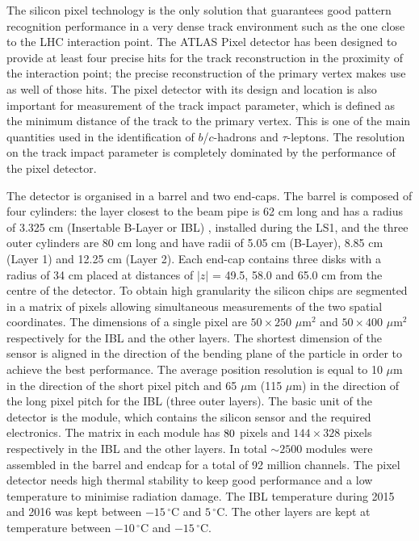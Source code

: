 The silicon pixel technology is the only solution that guarantees good pattern recognition performance in a very dense track environment such as the one close to the LHC interaction point. The ATLAS Pixel detector has been designed to provide at least four precise hits for the track reconstruction in the proximity of the interaction point;
 the precise reconstruction of the primary vertex makes use as well of those hits. The pixel detector with its design and location is also important for measurement of the track impact parameter, which is defined as the minimum distance of the track to the primary vertex. This is one of the main quantities used in the identification of $b$/$c$-hadrons and $\tau$-leptons. The resolution on the track impact parameter is completely dominated by the performance of the pixel detector.\par  The detector is organised in a barrel and two end-caps. The barrel is composed of four cylinders: the layer closest to the beam pipe is 62 cm long and has a radius of 3.325 cm (Insertable B-Layer or IBL) \cite{IBLTDR}, installed during the LS1, and the three outer cylinders are 80 cm long and have radii of 5.05 cm (B-Layer), 8.85 cm (Layer 1) and 12.25 cm (Layer 2). Each end-cap contains three disks with a radius of 34 cm placed at distances of $|z|$ = 49.5, 58.0 and 65.0 cm from the centre of the detector. To obtain high granularity the silicon chips are segmented in a matrix of pixels allowing simultaneous measurements of the two spatial coordinates. The dimensions of a single pixel are $50\times250$ $\mu $m$^{2}$ and $50\times400$ $\mu $m$^{2}$ respectively for the IBL and the other layers. The shortest dimension of the sensor is aligned in the direction of the bending plane of the particle in order to achieve the best performance. The average position resolution is equal to 10 $\mu$m in the direction of the short pixel pitch and 65 $\mu$m (115 $\mu$m) in the direction of the long pixel pitch for the IBL (three outer layers). The basic unit of the detector is the module, which contains the silicon sensor and the required electronics. The matrix in each module has $80\time336$ pixels and $144\times328$ pixels respectively in the IBL and the other layers. In total $\sim2500$ modules were assembled in the barrel and endcap for a total of 92 million channels. The pixel detector needs high thermal stability to keep good performance and a low temperature to minimise radiation damage. The IBL temperature during 2015 and 2016 was kept between $-15\,^{\circ}\mathrm{C}$ and $5\,^{\circ}\mathrm{C}$. The other layers are kept at temperature between $-10\,^{\circ}\mathrm{C}$ and $-15\,^{\circ}\mathrm{C}$.


